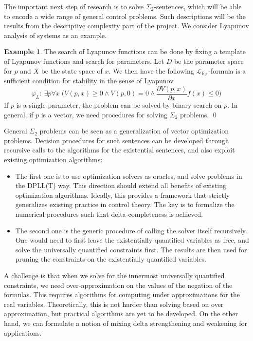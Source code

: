 \documentclass[10pt]{article}
\newcommand{\lrf}{\mathcal{L}_{\mathbb{R}_{\mathcal{F}}}}
\theoremstyle{definition}
\newtheorem{example}{Example}[section]
\begin{document}
The important next step of research is to solve $\Sigma_2$-sentences, which will be able to encode a wide range of general control problems. Such descriptions will be the results from the descriptive complexity part of the project. We consider Lyapunov analysis of systems as an example. 
\begin{example}
The search of Lyapunov functions can be done by fixing a template of Lyapunov functions and search for parameters. 
Let $D$ be the parameter space for $p$ and $X$ be the state space of $x$. We then have the following $\lrf$-formula is a sufficient condition for stability in the sense of Lyapunov
$$\varphi_L:\ \exists p\forall x\; \bigg(V(p,x)\geq 0 \wedge V(p,0) = 0\wedge \frac{\partial V(p,x)}{\partial x}f(x)\leq 0\bigg)$$
If $p$ is a single parameter, the problem can be solved by binary search on $p$. In general, if $p$ is a vector, we need procedures for solving $\Sigma_2$ problems. \qed
\end{example}
General $\Sigma_2$ problems can be seen as a generalization of vector optimization problems.  Decision procedures for such sentences can be developed through recursive calls to the algorithms for the existential sentences, and also exploit existing optimization algorithms:
\begin{itemize}
\item The first one is to use optimization solvers as oracles, and solve problems in the DPLL(T) way. This direction should extend all benefits of existing optimization algorithms. Ideally, this provides a framework that strictly generalizes existing practice in control theory. The key is to formalize the numerical procedures such that delta-completeness is achieved. 
\item The second one is the generic procedure of calling the solver itself recursively. One would need to first leave the existentially quantified variables as free, and solve the universally quantified constraints first. The results are then used for pruning the constraints on the existentially quantified variables. 
\end{itemize}
A challenge is that when we solve for the innermost universally quantified constraints, we need over-approximation on the values of the negation of the formulas. This requires algorithms for computing under approximations for the real variables. Theoretically, this is not harder than solving based on over approximation, but practical algorithms are yet to be developed. On the other hand, we can formulate a notion of mixing delta strengthening and weakening for applications.
\end{document}
